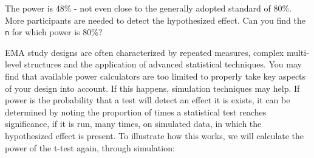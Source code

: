 \documentclass[]{book}
\newenvironment{Shaded}{\begin{snugshade}}{\end{snugshade}}
\newcommand{\KeywordTok}[1]{\textcolor[rgb]{0.13,0.29,0.53}{\textbf{#1}}}
\newcommand{\DecValTok}[1]{\textcolor[rgb]{0.00,0.00,0.81}{#1}}
\newcommand{\FloatTok}[1]{\textcolor[rgb]{0.00,0.00,0.81}{#1}}
\newcommand{\StringTok}[1]{\textcolor[rgb]{0.31,0.60,0.02}{#1}}
\newcommand{\CommentTok}[1]{\textcolor[rgb]{0.56,0.35,0.01}{\textit{#1}}}
\newcommand{\ControlFlowTok}[1]{\textcolor[rgb]{0.13,0.29,0.53}{\textbf{#1}}}
\newcommand{\OperatorTok}[1]{\textcolor[rgb]{0.81,0.36,0.00}{\textbf{#1}}}
\newcommand{\NormalTok}[1]{#1}
\begin{document}
The power is 48\% - not even close to the generally adopted standard of
80\%. More participants are needed to detect the hypothesized effect.
Can you find the \texttt{n} for which power is 80\%?

EMA study designs are often characterized by repeated measures, complex
multi-level structures and the application of advanced statistical
techniques. You may find that available power calculators are too
limited to properly take key aspects of your design into account. If
this happens, simulation techniques may help. If power is the
probability that a test will detect an effect it is exists, it can be
determined by noting the proportion of times a statistical test reaches
significance, if it is run, many times, on simulated data, in which the
hypothesized effect is present. To illustrate how this works, we will
calculate the power of the t-test again, through simulation:

  

\begin{Shaded}
\end{Shaded}
\end{document}
